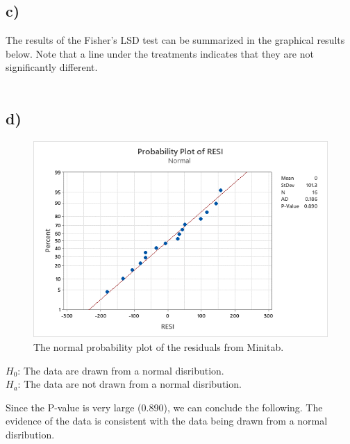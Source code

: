 \documentclass{article}
\begin{document}
\subsection*{c)}
The results of the Fisher's LSD test can be summarized in the graphical results below.
Note that a line under the treatments indicates that they are not significantly different. \\
\vspace{12pt}
\\


\subsection*{d)}

\begin{figure}[h]
    \centering
    \includegraphics[width=1\textwidth]{./images/2_d.png}
    \caption{The normal probability plot of the residuals from Minitab.}
    \label{fig:2_d}
\end{figure}
\begin{flushleft}
$H_0$: The data are drawn from a normal disribution. \\
$H_a$: The data are not drawn from a normal disribution. \\
\end{flushleft}
Since the P-value is very large (0.890), we can conclude the following. 
The evidence of the data is consistent with the data being drawn from a normal disribution.
\end{document}
